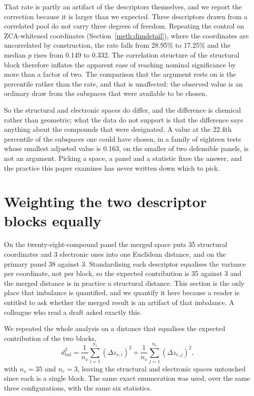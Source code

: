 \documentclass[11pt,a4paper]{article}
\begin{document}
That rate is partly an artifact of the descriptors themselves, and we report the
correction because it is larger than we expected. Three descriptors drawn from a
correlated pool do not carry three degrees of freedom. Repeating the control on
ZCA-whitened coordinates (Section~\ref{meth:dimdetail}), where the coordinates are
uncorrelated by construction, the rate falls from 28.95\% to 17.25\% and the
median $p$ rises from 0.149 to 0.332. The correlation structure of the
structural block therefore inflates the apparent ease of reaching nominal
significance by more than a factor of two. The comparison that the argument
rests on is the percentile rather than the rate, and that is unaffected: the
observed value is an ordinary draw from the subspaces that were available to be
chosen.

So the structural and electronic spaces do differ, and the difference is
chemical rather than geometric; what the data do not support is that the
difference says anything about the compounds that were designated. A value at
the 22.4th percentile of the subspaces one could have chosen, in a family of
eighteen tests whose smallest adjusted value is 0.163, on the smaller of two
defensible panels, is not an argument. Picking a space, a panel and a statistic
fixes the answer, and the practice this paper examines has never written down
which to pick.

\section{Weighting the two descriptor blocks equally}
\label{res:blockbalance}

On the twenty-eight-compound panel the merged space puts 35 structural
coordinates and 3 electronic ones into one Euclidean distance, and on the
primary panel 38 against 3. Standardising each descriptor equalises the variance per
coordinate, not per block, so the expected contribution is 35 against 3 and the
merged distance is in practice a structural distance. This section is the only
place that imbalance is quantified, and we quantify it here because a reader is entitled to ask whether the merged
result is an artifact of that imbalance. A colleague who read a draft asked
exactly this.

We repeated the whole analysis on a distance that equalises the expected
contribution of the two blocks,
\begin{equation}
d_{\mathrm{bal}}^{2}=\frac{1}{n_{s}}\sum_{i=1}^{n_{s}}(\Delta z_{s,i})^{2}
 +\frac{1}{n_{e}}\sum_{j=1}^{n_{e}}(\Delta z_{e,j})^{2},
\end{equation}
with $n_{s}=35$ and $n_{e}=3$, leaving the structural and electronic spaces
untouched since each is a single block. The same exact enumeration was used, over
the same three configurations, with the same six statistics.
\end{document}
